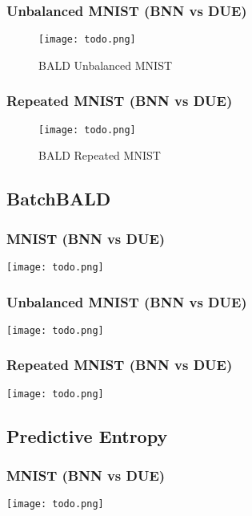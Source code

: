 \documentclass[12pt, a4paper]{report}
\theoremstyle{definition}
\begin{document}
\subsubsection{Unbalanced MNIST (BNN vs DUE)}

\begin{figure}[H]
\centering
\texttt{[image: todo.png]}
\caption{BALD Unbalanced MNIST}
\end{figure}

\subsubsection{Repeated MNIST (BNN vs DUE)}

\begin{figure}[H]
\centering
\texttt{[image: todo.png]}
\caption{BALD Repeated MNIST}
\end{figure}
    

\subsection{BatchBALD}

\subsubsection{MNIST (BNN vs DUE)}

\texttt{[image: todo.png]}

\subsubsection{Unbalanced MNIST (BNN vs DUE)}

\texttt{[image: todo.png]}

\subsubsection{Repeated MNIST (BNN vs DUE)}

\texttt{[image: todo.png]}


\subsection{Predictive Entropy}

\subsubsection{MNIST (BNN vs DUE)}

\texttt{[image: todo.png]}
\end{document}
